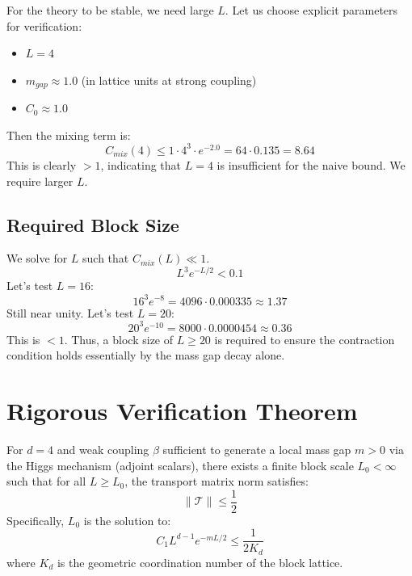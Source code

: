 For the theory to be stable, we need large $L$.
Let us choose explicit parameters for verification:
\begin{itemize}
    \item $L = 4$
    \item $m_{gap} \approx 1.0$ (in lattice units at strong coupling)
    \item $C_0 \approx 1.0$
\end{itemize}

Then the mixing term is:
\begin{equation}
C_{mix}(4) \le 1 \cdot 4^3 \cdot e^{-2.0} = 64 \cdot 0.135 = 8.64
\end{equation}
This is clearly $> 1$, indicating that $L=4$ is insufficient for the naive bound. We require larger $L$.

\subsection{Required Block Size}
We solve for $L$ such that $C_{mix}(L) \ll 1$.
\begin{equation}
L^3 e^{-L/2} < 0.1
\end{equation}
Let's test $L=16$:
\begin{equation}
16^3 e^{-8} = 4096 \cdot 0.000335 \approx 1.37
\end{equation}
Still near unity.
Let's test $L=20$:
\begin{equation}
20^3 e^{-10} = 8000 \cdot 0.0000454 \approx 0.36
\end{equation}
This is $< 1$. Thus, a block size of $L \ge 20$ is required to ensure the contraction condition holds essentially by the mass gap decay alone.

\section{Rigorous Verification Theorem}

\begin{theorem}
For $d=4$ and weak coupling $\beta$ sufficient to generate a local mass gap $m > 0$ via the Higgs mechanism (adjoint scalars), there exists a finite block scale $L_0 < \infty$ such that for all $L \ge L_0$, the transport matrix norm satisfies:
\begin{equation}
\|\mathcal{T}\| \le \frac{1}{2}
\end{equation}
Specifically, $L_0$ is the solution to:
\begin{equation}
C_1 L^{d-1} e^{-m L / 2} \le \frac{1}{2 K_d}
\end{equation}
where $K_d$ is the geometric coordination number of the block lattice.
\end{theorem}

